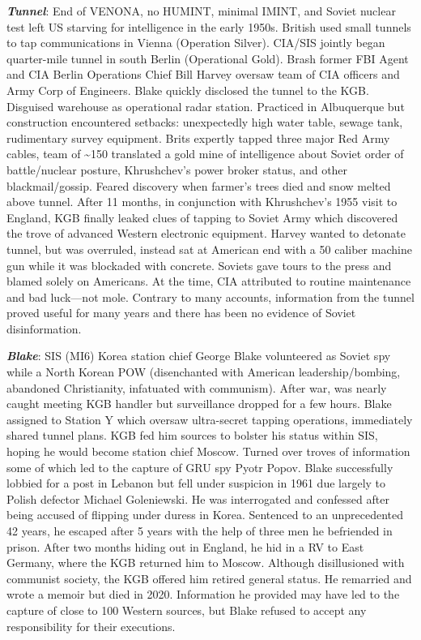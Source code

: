 \documentclass[
]{article}
\begin{document}
\textbf{\emph{Tunnel}}: End of VENONA, no HUMINT, minimal IMINT, and
Soviet nuclear test left US starving for intelligence in the early
1950s. British used small tunnels to tap communications in Vienna
(Operation Silver). CIA/SIS jointly began quarter-mile tunnel in south
Berlin (Operational Gold). Brash former FBI Agent and CIA Berlin
Operations Chief Bill Harvey oversaw team of CIA officers and Army Corp
of Engineers. Blake quickly disclosed the tunnel to the KGB. Disguised
warehouse as operational radar station. Practiced in Albuquerque but
construction encountered setbacks: unexpectedly high water table, sewage
tank, rudimentary survey equipment. Brits expertly tapped three major
Red Army cables, team of \textasciitilde150 translated a gold mine of
intelligence about Soviet order of battle/nuclear posture, Khrushchev's
power broker status, and other blackmail/gossip. Feared discovery when
farmer's trees died and snow melted above tunnel. After 11 months, in
conjunction with Khrushchev's 1955 visit to England, KGB finally leaked
clues of tapping to Soviet Army which discovered the trove of advanced
Western electronic equipment. Harvey wanted to detonate tunnel, but was
overruled, instead sat at American end with a 50 caliber machine gun
while it was blockaded with concrete. Soviets gave tours to the press
and blamed solely on Americans. At the time, CIA attributed to routine
maintenance and bad luck---not mole. Contrary to many accounts,
information from the tunnel proved useful for many years and there has
been no evidence of Soviet disinformation.

\textbf{\emph{Blake}}: SIS (MI6) Korea station chief George Blake
volunteered as Soviet spy while a North Korean POW (disenchanted with
American leadership/bombing, abandoned Christianity, infatuated with
communism). After war, was nearly caught meeting KGB handler but
surveillance dropped for a few hours. Blake assigned to Station Y which
oversaw ultra-secret tapping operations, immediately shared tunnel
plans. KGB fed him sources to bolster his status within SIS, hoping he
would become station chief Moscow. Turned over troves of information
some of which led to the capture of GRU spy Pyotr Popov. Blake
successfully lobbied for a post in Lebanon but fell under suspicion in
1961 due largely to Polish defector Michael Goleniewski. He was
interrogated and confessed after being accused of flipping under duress
in Korea. Sentenced to an unprecedented 42 years, he escaped after 5
years with the help of three men he befriended in prison. After two
months hiding out in England, he hid in a RV to East Germany, where the
KGB returned him to Moscow. Although disillusioned with communist
society, the KGB offered him retired general status. He remarried and
wrote a memoir but died in 2020. Information he provided may have led to
the capture of close to 100 Western sources, but Blake refused to accept
any responsibility for their executions.
\end{document}
